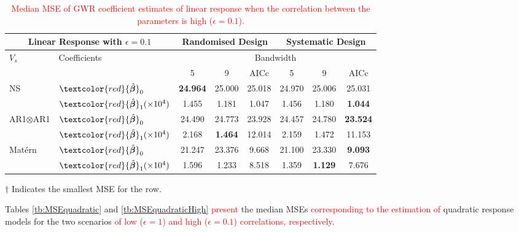 \documentclass[a4paper]{article} 	%
\newcommand{\Matern}{Mat\'ern }
\newcommand{\revision}[1]{\textcolor{red}{#1}}
\newcommand{\zc}[1]{\textcolor{red}{#1}}
\begin{document}
\begin{table}[!htp]
	\centering
\begin{threeparttable}
\caption{\zc{Median MSE of GWR coefficient estimates of linear response when the correlation between the parameters is high ($\epsilon=0.1$).}}\label{tb:MSElinearHigh}
\begin{tabular}{ll|ccc|ccc}
\toprule
\multicolumn{2}{c}{Linear Response with $\epsilon=0.1$} & \multicolumn{3}{c}{Randomised Design} & \multicolumn{3}{c}{Systematic Design} \\ \midrule
\multirow{2}{*}{$V_s$} & \multirow{2}{*}{Coefficients}  & \multicolumn{6}{c}{Bandwidth}\\ 
&  & 5  & 9  & AICc & 5  & 9  & AICc \\ \midrule
\multirow{2}{*}{NS}   & $\zc{\hat{\bm{\beta}}}_0$ & \bf{24.964}\tnote{$\dagger$}  & 25.000 & 25.018    & 24.970 & 25.006 & 25.031 \\ 
& $\zc{\hat{\bm{\beta}}}_1 (\times 10^4)$ &  1.455  & 1.181  & 1.047     & 1.456  & 1.180  & \bf{1.044}\tnote{$\dagger$}   \\  \midrule
\multirow{2}{*}{AR1$\otimes$AR1}  & $\zc{\hat{\bm{\beta}}}_0$ & 24.490 & 24.773 & 23.928    & 24.457 & 24.780 & \bf{23.524}\tnote{$\dagger$}    \\ 
& $\zc{\hat{\bm{\beta}}}_1 (\times 10^4)$ &  2.168  & \bf{1.464}\tnote{$\dagger$}  & 12.014    & 2.159  & 1.472  & 11.153    \\ \midrule
\multirow{2}{*}{\Matern} & $\zc{\hat{\bm{\beta}}}_0$ & 21.247 & 23.376 & 9.668     & 21.100 & 23.330 & \bf{9.093}\tnote{$\dagger$}  \\ 
& $\zc{\hat{\bm{\beta}}}_1 (\times 10^4)$ & 1.596 & 1.233  & 8.518     & 1.359  & \bf{1.129}\tnote{$\dagger$}  & 7.676 \\
\bottomrule
\end{tabular}
\begin{tablenotes}
\item[$\dagger$] \footnotesize Indicates the smallest MSE for the row.
\end{tablenotes}
\end{threeparttable}
\end{table}

Tables \ref{tb:MSEquadratic} and \ref{tb:MSEquadraticHigh} \revision{present} the median MSEs \revision{corresponding to the estimation of} quadratic response models for the two scenarios \revision{of low ($\epsilon = 1$) and high ($\epsilon = 0.1$) correlations, respectively}. \revision{}
\end{document}
